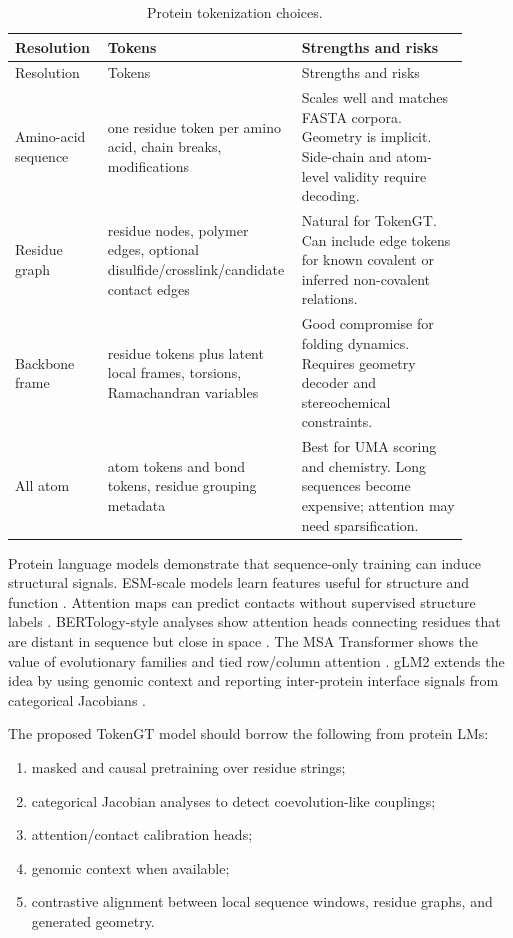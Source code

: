 \documentclass[11pt]{article}
\begin{document}
\begin{longtable}{p{0.2\linewidth}p{0.34\linewidth}p{0.36\linewidth}}
\caption{Protein tokenization choices.}\\
\toprule
Resolution & Tokens & Strengths and risks\\
\midrule
\endfirsthead
\toprule
Resolution & Tokens & Strengths and risks\\
\midrule
\endhead
Amino-acid sequence & one residue token per amino acid, chain breaks, modifications & Scales well and matches FASTA corpora. Geometry is implicit. Side-chain and atom-level validity require decoding.\\
Residue graph & residue nodes, polymer edges, optional disulfide/crosslink/candidate contact edges & Natural for TokenGT. Can include edge tokens for known covalent or inferred non-covalent relations.\\
Backbone frame & residue tokens plus latent local frames, torsions, Ramachandran variables & Good compromise for folding dynamics. Requires geometry decoder and stereochemical constraints.\\
All atom & atom tokens and bond tokens, residue grouping metadata & Best for UMA scoring and chemistry. Long sequences become expensive; attention may need sparsification.\\
\bottomrule
\end{longtable}

Protein language models demonstrate that sequence-only training can induce structural signals. ESM-scale models learn features useful for structure and function \cite{rives2021biological}. Attention maps can predict contacts without supervised structure labels \cite{rao2021unsupervised}. BERTology-style analyses show attention heads connecting residues that are distant in sequence but close in space \cite{vig2021bertology}. The MSA Transformer shows the value of evolutionary families and tied row/column attention \cite{rao2021msa}. gLM2 extends the idea by using genomic context and reporting inter-protein interface signals from categorical Jacobians \cite{cornman2024omg}.

The proposed TokenGT model should borrow the following from protein LMs:
\begin{enumerate}[leftmargin=2em]
  \item masked and causal pretraining over residue strings;
  \item categorical Jacobian analyses to detect coevolution-like couplings;
  \item attention/contact calibration heads;
  \item genomic context when available;
  \item contrastive alignment between local sequence windows, residue graphs, and generated geometry.
\end{enumerate}
\end{document}
